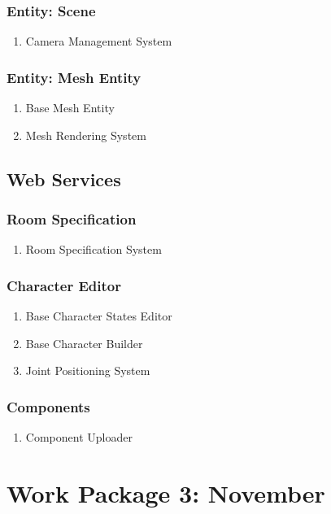 \subsubsection{Entity: Scene}
\begin{enumerate}
\item Camera Management System
\end{enumerate}
\subsubsection{Entity: Mesh Entity}
\begin{enumerate}
\item Base Mesh Entity
\item Mesh Rendering System
\end{enumerate}


\subsection{Web Services}
\subsubsection{Room Specification}
\begin{enumerate}
\item Room Specification System
\end{enumerate}
\subsubsection{Character Editor}
\begin{enumerate} 
\item Base Character States Editor
\item Base Character Builder
\item Joint Positioning System
\end{enumerate}
\subsubsection{Components}
\begin{enumerate} 
\item Component Uploader
\end{enumerate}


\section{Work Package 3: November}
